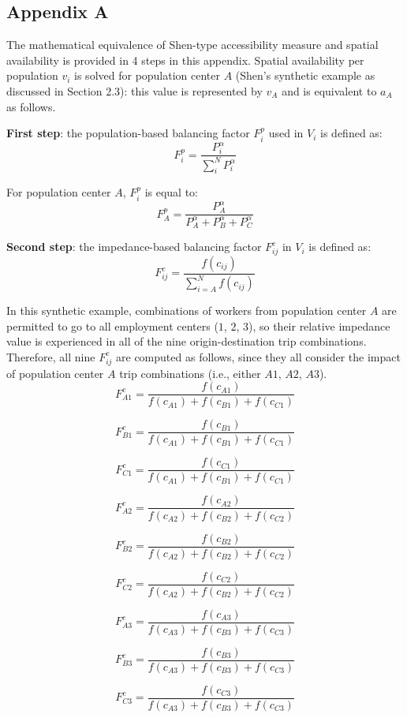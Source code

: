 \documentclass[10pt,letterpaper]{article}
\begin{document}
\begin{landscape}

\section{Appendix A}

The mathematical equivalence of Shen-type accessibility measure and spatial availability is provided in 4 steps in this appendix. Spatial availability per population $v_i$ is solved for population center $A$ (Shen's synthetic example as discussed in Section 2.3): this value is represented by $v_A$ and is equivalent to $a_A$ as follows.

\textbf{First step}: the population-based balancing factor $F^p_{i}$ used in $V_i$ is defined as:
$$
F^p_{i} = \frac{P_{i}^\alpha}{\sum_{i}^N P_{i}^\alpha}
$$

For population center $A$, $F^p_{i}$ is equal to:
$$
F^p_{A} = \frac{P_{A}^\alpha}{P_{A}^\alpha + P_{B}^\alpha + P_{C}^\alpha}
$$

\textbf{Second step}: the impedance-based balancing factor $F^c_{ij}$ in $V_i$ is defined as:
$$
F^c_{ij} = \frac{f(c_{ij})}{\sum_{i=A}^N f(c_{ij})}
$$

In this synthetic example, combinations of workers from population center $A$ are permitted to go to all employment centers ($1$, $2$, $3$), so their relative impedance value is experienced in all of the nine origin-destination trip combinations. Therefore, all nine $F^c_{ij}$ are computed as follows, since they all consider the impact of population center $A$ trip combinations (i.e., either $A1$, $A2$, $A3$).
$$
F^c_{A1} = \frac{f(c_{A1})}{f(c_{A1})+f(c_{B1})+f(c_{C1})}
$$

$$
F^c_{B1} = \frac{f(c_{B1})}{f(c_{A1})+f(c_{B1})+f(c_{C1})}
$$

$$
F^c_{C1} = \frac{f(c_{C1})}{f(c_{A1})+f(c_{B1})+f(c_{C1})}
$$

$$
F^c_{A2} = \frac{f(c_{A2})}{f(c_{A2})+f(c_{B2})+f(c_{C2})}
$$

$$
F^c_{B2} = \frac{f(c_{B2})}{f(c_{A2})+f(c_{B2})+f(c_{C2})}
$$

$$
F^c_{C2} = \frac{f(c_{C2})}{f(c_{A2})+f(c_{B2})+f(c_{C2})}
$$

$$
F^c_{A3} = \frac{f(c_{A3})}{f(c_{A3})+f(c_{B3})+f(c_{C3})}
$$

$$
F^c_{B3} = \frac{f(c_{B3})}{f(c_{A3})+f(c_{B3})+f(c_{C3})}
$$

$$
F^c_{C3} = \frac{f(c_{C3})}{f(c_{A3})+f(c_{B3})+f(c_{C3})}
$$


\end{landscape}
\end{document}
